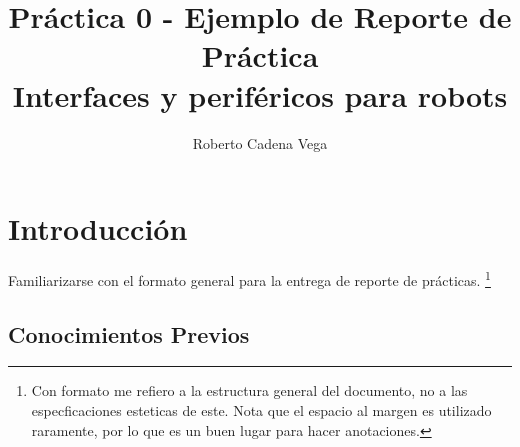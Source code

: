 



\title{Práctica 0 - Ejemplo de Reporte de Práctica\\Interfaces y periféricos para robots}
\author{Roberto Cadena Vega} %
\date{}




\maketitle %


\section{Introducción}

	Familiarizarse con el formato general para la entrega de reporte de prácticas. \footnote{Con formato me refiero a la estructura general del documento, no a las especficaciones esteticas de este. Nota que el espacio al margen es utilizado raramente, por lo que es un buen lugar para hacer anotaciones.}


\subsection{Conocimientos Previos}


